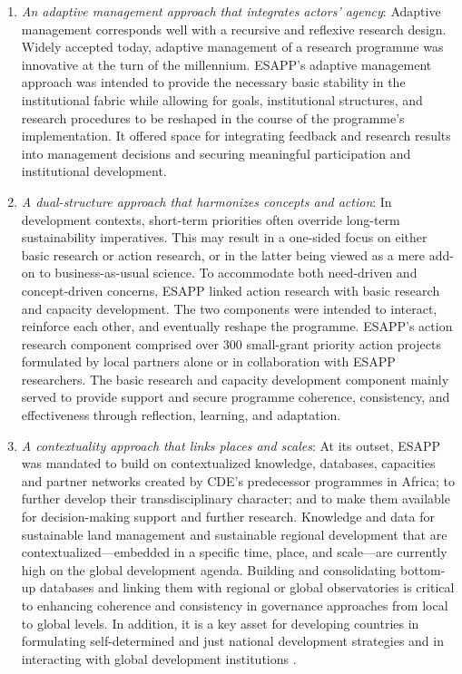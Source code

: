 \documentclass[10pt,a4paper]{article}
\begin{document}
\begin{multicols}{2}
\begin{enumerate}
\item \textit{An adaptive management approach that integrates actors' agency}: Adaptive management corresponds well with a recursive and reflexive research design. Widely accepted today, adaptive management of a research programme was innovative at the turn of the millennium. ESAPP’s adaptive management approach was intended to provide the necessary basic stability in the institutional fabric while allowing for goals, institutional structures, and research procedures to be reshaped in the course of the programme’s implementation. It offered space for integrating feedback and research results into management decisions and securing meaningful participation and institutional development. 
\item \textit{A dual-structure approach that harmonizes concepts and action}: In development contexts, short-term priorities often override long-term sustainability imperatives. This may result in a one-sided focus on either basic research or action research, or in the latter being viewed as a mere add-on to business-as-usual science. To accommodate both need-driven and concept-driven concerns, ESAPP linked action research with basic research and capacity development. The two components were intended to interact, reinforce each other, and eventually reshape the programme. ESAPP’s action research component comprised over 300 small-grant priority action projects formulated by local partners alone or in collaboration with ESAPP researchers. The basic research and capacity development component mainly served to provide support and secure programme coherence, consistency, and effectiveness through reflection, learning, and adaptation.
\item \textit{A contextuality approach that links places and scales}: At its outset, ESAPP was mandated to build on contextualized knowledge, databases, capacities and partner networks created by CDE's predecessor programmes in Africa; to further develop their transdisciplinary character; and to make them available for decision-making support and further research. Knowledge and data for sustainable land management and sustainable regional development that are contextualized---embedded in a specific time, place, and scale---are currently high on the global development agenda. Building and consolidating bottom-up databases and linking them with regional or global observatories is critical to enhancing coherence and consistency in governance approaches from local to global levels. In addition, it is a key asset for developing countries in formulating self-determined and just national development strategies and in interacting with global development institutions \citep{r30, r64}. 
\end{enumerate}


\end{multicols}
\end{document}
